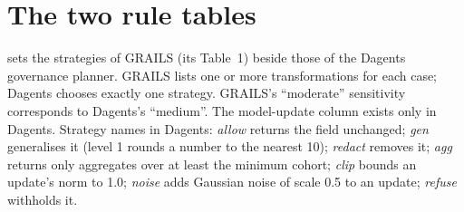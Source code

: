 \section{The two rule tables}
\label{app:rules}

 sets the strategies of GRAILS (its Table~1) beside those of the
Dagents governance planner. GRAILS lists one or more transformations for each
case; Dagents chooses exactly one strategy. GRAILS's ``moderate'' sensitivity
corresponds to Dagents's ``medium''. The model-update column exists only in
Dagents. Strategy names in Dagents: \emph{allow} returns the field unchanged;
\emph{gen} generalises it (level 1 rounds a number to the nearest 10);
\emph{redact} removes it; \emph{agg} returns only aggregates over at least the
minimum cohort; \emph{clip} bounds an update's norm to 1.0; \emph{noise} adds
Gaussian noise of scale 0.5 to an update; \emph{refuse} withholds it.

